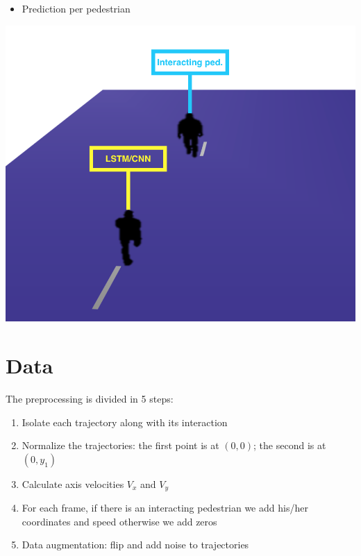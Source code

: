 \documentclass[a0,portrait]{a0poster}
\begin{document}
\begin{multicols}{2}
\begin{center}
\begin{minipage}[H]{0.45\linewidth-}
\begin{itemize}
\item Prediction per pedestrian
\end{itemize}
\vspace{1.5cm}
\centerline {\includegraphics[scale = 0.6]{figure/OurModel}}
\end{minipage}
\end{center}

\section*{Data}

The preprocessing is divided in 5 steps:
\begin{enumerate}
\item Isolate each trajectory along with its interaction
\item Normalize the trajectories: the first point is at $(0,0)$; the second is at $(0,y_1)$
\item Calculate axis velocities $V_x$ and $V_y$
\item For each frame, if there is an interacting pedestrian we add his/her coordinates and speed otherwise we add zeros
\item Data augmentation: flip and add noise to trajectories
\end{enumerate}


\end{multicols}
\end{document}

